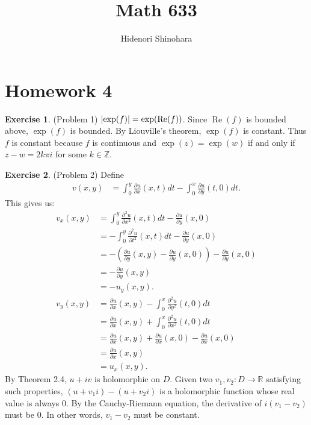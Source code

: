 \documentclass[12pt, psamsfonts]{amsart}
\theoremstyle{definition}
\newtheorem*{exer}{Exercise}
\theoremstyle{remark}
\DeclareMathOperator{\Re}{Re}
\numberwithin{equation}{section}
\begin{document}
\title{Math 633}
\author{Hidenori Shinohara}
\maketitle

\section{Homework 4}

\begin{exer}{(Problem 1)}
  $\abs{\exp(f)} = \exp(\Re(f))$.
  Since $\Re(f)$ is bounded above, $\exp(f)$ is bounded.
  By Liouville's theorem, $\exp(f)$ is constant.
  Thus $f$ is constant because $f$ is continuous and $\exp(z) = \exp(w)$ if and only if $z - w = 2k\pi i$ for some $k \in \mathbb{Z}$.
\end{exer}

\begin{exer}{(Problem 2)}
  Define
  \begin{align*}
    v(x, y) &= \int_{0}^{y} \frac{\partial u}{\partial x}(x, t) dt - \int_{0}^{x} \frac{\partial u}{\partial y}(t, 0) dt.
  \end{align*}
  This gives us:
  \begin{align*}
    v_x(x, y)
      &= \int_{0}^{y} \frac{\partial^2 u}{\partial x^2}(x, t) dt - \frac{\partial u}{\partial y}(x, 0) \\
      &= -\int_{0}^{y} \frac{\partial^2 u}{\partial t^2}(x, t) dt - \frac{\partial u}{\partial y}(x, 0) \\
      &= -(\frac{\partial u}{\partial y}(x, y) - \frac{\partial u}{\partial y}(x, 0)) - \frac{\partial u}{\partial y}(x, 0) \\
      &= -\frac{\partial u}{\partial y}(x, y) \\
      &= -u_y(x, y). \\
    v_y(x, y)
      &= \frac{\partial u}{\partial x}(x, y) - \int_0^x \frac{\partial^2 u}{\partial y^2}(t, 0) dt \\
      &= \frac{\partial u}{\partial x}(x, y) + \int_0^x \frac{\partial^2 u}{\partial x^2}(t, 0) dt \\
      &= \frac{\partial u}{\partial x}(x, y) + \frac{\partial u}{\partial x}(x, 0) - \frac{\partial u}{\partial x}(x, 0) \\
      &= \frac{\partial u}{\partial x}(x, y) \\
      &= u_x(x, y).
  \end{align*}
  By Theorem 2.4, $u + iv$ is holomorphic on $D$.
  Given two $v_1, v_2:D \rightarrow \mathbb{R}$ satisfying such properties, $(u + v_1i) - (u + v_2i)$ is a holomorphic function whose real value is always 0.
  By the Cauchy-Riemann equation, the derivative of $i(v_1 - v_2)$ must be 0.
  In other words, $v_1 - v_2$ must be constant.
\end{exer}
\end{document}
